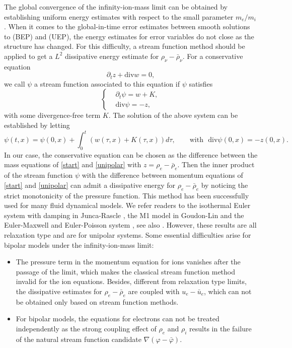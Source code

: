 \documentclass[reqno,twoside,12pt,a4paper]{amsart}
\newcommand{\dive}{\mathrm{div}}
\newcommand{\pt}{\partial_t}
\newcommand{\D}{\nabla}
\newcommand{\vp}{\varphi}
\numberwithin{equation}{section}
\begin{document}
The global convergence of the infinity-ion-mass limit can be obtained by establishing uniform energy estimates with respect to the small parameter $m_e/m_i$. When it comes to the global-in-time error estimates between smooth solutions to (BEP) and (UEP), the energy estimates for error variables do not close as the structure has changed. For this difficulty, a stream function method should be applied to get a $L^2$ dissipative energy estimate for $\rho_\nu-\bar{\rho}_\nu$. For a conservative equation
\begin{equation*}
	\pt z + \dive w=0,
\end{equation*}
we call $\psi$ a stream function associated to this equation if $\psi$ satisfies
\[
\left\{
\begin{aligned}
&\pt \psi=w+K,\\
&\dive \psi=-z,
\end{aligned}
\right.
\] 
with some divergence-free term $K$. The solution of the above system can be established by letting
\[
\psi(t,x)=\psi(0,x)+\int_{0}^{t} (w(\tau,x)+K(\tau,x))d\tau, \qquad \text{with}\,\,\,\,\dive \psi(0,x)=-z(0,x).
\]
In our case, the conservative equation can be chosen as the difference between the mass equations of \eqref{start} and \eqref{unipolar} with $z=\rho_e-\bar{\rho}_e$. Then the inner product of the stream function $\psi$ with the difference between momentum equations of \eqref{start} and \eqref{unipolar} can admit a dissipative energy for $\rho_e-\bar{\rho}_e$ by noticing the strict monotonicity of the pressure function. This method has been successfully used for many fluid dynamical models. We refer readers to the isothermal Euler system with damping in Junca-Rascle \cite{Junca2002}, the M1 model in Goudon-Lin \cite{GOUDON2013579} and the Euler-Maxwell and Euler-Poisson system \cite{LI2021185}, see also \cite{Li2021, Zhao2021a}. However, these results are all relaxation type and are for unipolar systems. Some essential difficulties arise for bipolar models under the infinity-ion-mass limit:

\begin{itemize}
	\item The pressure term in the momentum equation for ions vanishes after the passage of the limit, which makes the classical stream function method invalid for the ion equations. Besides, different from relaxation type limits, the dissipative estimates for $\rho_e-\bar{\rho}_e$ are coupled with $u_e-\bar{u}_e$, which can not be obtained only based on stream function methods. 
	\item  For bipolar models, the equations for electrons can not be treated independently as the strong coupling effect of $\rho_e$ and $\rho_i$ results in the failure of the natural stream function candidate $\D(\vp-\bar{\vp})$.
\end{itemize}
\end{document}
